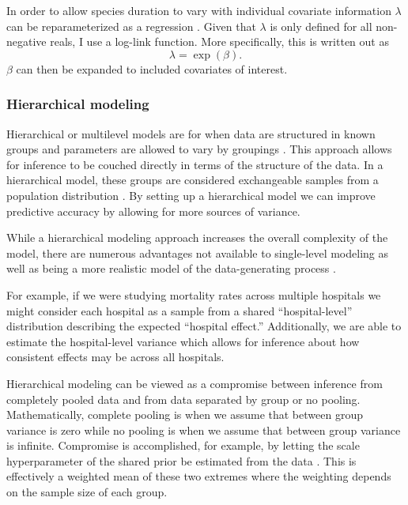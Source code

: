 \documentclass[12pt,letterpaper]{article}
\begin{document}
In order to allow species duration to vary with individual covariate information \(\lambda\) can be reparameterized as a regression \citep{Klein2003}. Given that \(\lambda\) is only defined for all non-negative reals, I use a log-link function. More specifically, this is written out as 
\begin{equation}
  \lambda = \exp(\beta).
  \label{eq:lambda}
\end{equation}
\(\beta\) can then be expanded to included covariates of interest.


\subsubsection{Hierarchical modeling}
Hierarchical or multilevel models are for when data are structured in known groups and parameters are allowed to vary by groupings \citep{Gelman2007,Gelman2013d}. This approach allows for inference to be couched directly in terms of the structure of the data. In a hierarchical model, these groups are considered exchangeable samples from a population distribution \citep{Gelman2013d}. By setting up a hierarchical model we can improve predictive accuracy by allowing for more sources of variance.

While a hierarchical modeling approach increases the overall complexity of the model, there are numerous advantages not available to single-level modeling as well as being a more realistic model of the data-generating process \citep{Gelman2007,Gelman2013d}.

For example, if we were studying mortality rates across multiple hospitals we might consider each hospital as a sample from a shared ``hospital-level'' distribution describing the expected ``hospital effect.'' Additionally, we are able to estimate the hospital-level variance which allows for inference about how consistent effects may be across all hospitals.

Hierarchical modeling can be viewed as a compromise between inference from completely pooled data and from data separated by group or no pooling. Mathematically, complete pooling is when we assume that between group variance is zero while no pooling is when we assume that between group variance is infinite. Compromise is accomplished, for example, by letting the scale hyperparameter of the shared prior be estimated from the data \citep{Gelman2013d}. This is effectively a weighted mean of these two extremes where the weighting depends on the sample size of each group.
\end{document}
